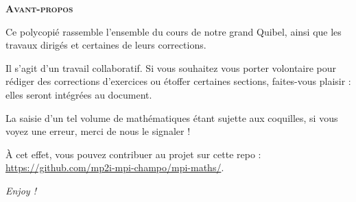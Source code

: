 \vspace*{3cm}

\begin{center}
  {\LARGE\bfseries\color{vorange!95!black}\scshape Avant-propos\par}
  \vspace{0.4cm}
\end{center}

\vspace{1.5cm}

\begin{center}
\begin{minipage}{0.85\textwidth}
  \setlength{\parindent}{1.5em}
  \setlength{\parskip}{0.8em}
  \large 

  {
  Ce polycopié rassemble l'ensemble du cours de notre grand Quibel, ainsi que les travaux dirigés et certaines de leurs corrections.
  
  Il s'agit d'un travail collaboratif. Si vous souhaitez vous porter volontaire pour rédiger des corrections d'exercices ou étoffer certaines sections, faites-vous plaisir : elles seront intégrées au document.
  
  La saisie d'un tel volume de mathématiques étant sujette aux coquilles, si vous voyez une erreur, merci de nous le signaler !

  À cet effet, vous pouvez contribuer au projet sur cette repo : \url{https://github.com/mp2i-mpi-champo/mpi-maths/}.
  \par}
  \vspace{1.8cm}
  \begin{center}
    \itshape Enjoy !
  \end{center}
\end{minipage}
\end{center}

\vfill
